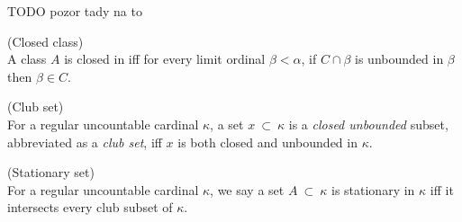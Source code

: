 TODO pozor tady na to

\begin{definition}{(Closed class)}\\
A class $A$ is closed in iff for every limit ordinal $\beta < \alpha$, if $C \cap \beta$ is unbounded in $\beta$ then $\beta \in C$.
\end{definition}

\begin{definition}{(Club set)}\\
For a regular uncountable cardinal $\kappa$, a set $x\ \subset\ \kappa$ is a \emph{closed unbounded} subset, abbreviated as a \emph{club set}, iff $x$ is both closed and unbounded in $\kappa$.
\end{definition}

\begin{definition}{(Stationary set)}\\
For a regular uncountable cardinal $\kappa$, we say a set $A\ \subset\ \kappa$ is stationary in $\kappa$ iff it intersects every club subset of $\kappa$.
\end{definition}

\



